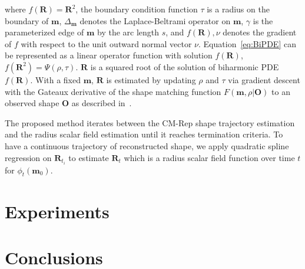 \documentclass{llncs}
\begin{document}
where $f(\mathbf{R}) = \mathbf{R}^2$, the boundary condition function $\tau$ is a radius on the boundary of $\mathbf{m}$, $\Delta_{\mathbf{m}}$ denotes the Laplace-Beltrami operator on $\mathbf{m}$, $\gamma$ is the parameterized edge of $\mathbf{m}$ by the arc length $s$, and $f(\mathbf{R}), \nu$ denotes the gradient of $f$ with respect to the unit outward normal vector $\nu$. 
Equation~\ref{eq:BiPDE} can be represented as a linear operator function with solution $f(\mathbf{R})$, $f(\mathbf{R}^2) = \Psi( \rho, \tau)$.
$\mathbf{R}$ is a squared root of the solution of biharmonic PDE $f(\mathbf{R})$. 
With a fixed $\mathbf{m}$, $\mathbf{R}$ is estimated by updating $\rho$ and $\tau$ via gradient descent with the Gateaux derivative of the shape matching function $F( \mathbf{m}, \rho | \mathbf{O})$ to an observed shape $\mathbf{O}$ as described in~\cite{Yushkevich2006}.

The proposed method iterates between the CM-Rep shape trajectory estimation and the radius scalar field estimation until it reaches termination criteria. 
To have a continuous trajectory of reconstructed shape, we apply quadratic spline regression on $\mathbf{R}_{t_i}$ to estimate $\mathbf{R}_t$ which is a radius scalar field function over time $t$ for $\phi_t(\mathbf{m}_0)$. 

\section{Experiments}

\section{Conclusions}

\begin{comment}
In this study, we proposed a novel framework that makes use of subject-specific shape deformation trajectories by diffeomorphic shape regression models and the longitudinal statistical analysis.
Results show how the shape deformation has more significance than the volumetric analysis and how significantly it correlates with continuous CAP score for a global shape and local subregions. 
The global shape analysis showed that the gradient magnitude of deformation vectors over global shape has better significance than volume-wise metric regardless of different baseline shapes of different subjects.
The local shape analysis also revealed statistically significant general trends of subregion shape changes. 
As a future direction, the analysis will also be extended to develop an HD progression model that will allow prediction of the stage of disease of individuals based on shape biomarkers.
\end{comment}



\end{document}
